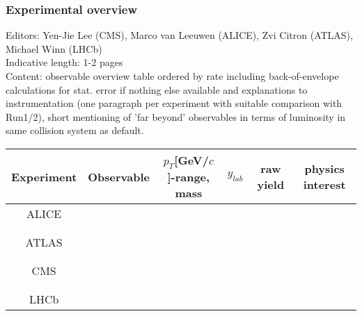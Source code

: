 \documentclass[../report.tex]{subfiles}
\begin{document}
\subsubsection{Experimental overview}
Editors: Yen-Jie Lee (CMS), Marco van Leeuwen (ALICE), Zvi Citron (ATLAS), Michael Winn (LHCb)\\
Indicative length: 1-2 pages\\
Content: observable overview table ordered by rate including back-of-envelope calculations for stat. error if nothing else available and explanations to instrumentation (one paragraph per experiment with suitable comparison with Run1/2), short mentioning of 'far beyond' observables in terms of luminosity in same collision system as default.

\begin{table}[htbp]
 {\footnotesize
\centering
\begin{tabular}{|c|c|c|c|c|c|}
\hline
Experiment   & Observable & $p_{T}$[GeV/$c$]-range, mass & $y_{lab}$               & raw yield & physics interest \\
\hline 
ALICE  &                  &          &        &                    &        \\ 
       &                  &          &        &                    & 
\\
       &                  &          &        &                    & 
\\
\hline
ATLAS  &                  &          &        &                     &        \\
       &                  &          &        &                    & 
\\
       &                  &          &        &                    & 
\\
\hline
CMS    &                  &          &        &                    &         \\
       &                  &          &        &                    & 
\\
       &                  &          &        &                    & 
\\
\hline
LHCb   &                  &          &         &                    &         \\


\end{tabular}}
\end{table}
\end{document}
